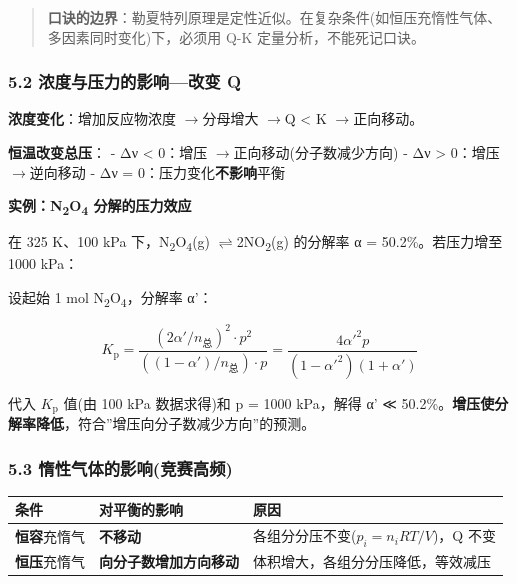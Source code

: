 \documentclass[a4paper,11pt]{ctexart}
\newcounter{none}
\newcommand{\箭}{\ensuremath{\rightarrow}}
\newcommand{\左箭}{\ensuremath{\leftarrow}}
\newcommand{\上箭}{\ensuremath{\uparrow}}
\newcommand{\下箭}{\ensuremath{\downarrow}}
\newcommand{\衡}{\ensuremath{\rightleftharpoons}}
\newcommand{\双箭}{\ensuremath{\leftrightarrow}}
\newcommand{\约等于}{\ensuremath{\approx}}
\newcommand{\小于等于}{\ensuremath{\leq}}
\newcommand{\大于等于}{\ensuremath{\geq}}
\newcommand{\不等于}{\ensuremath{\neq}}
\newcommand{\西格马}{\ensuremath{\sigma}}
\newcommand{\派}{\ensuremath{\pi}}
\begin{document}
\begin{quote}
\textbf{口诀的边界}：勒夏特列原理是定性近似。在复杂条件(如恒压充惰性气体、多因素同时变化)下，必须用 Q-K 定量分析，不能死记口诀。
\end{quote}

\subsubsection{5.2 浓度与压力的影响---改变 Q}\label{ux6d53ux5ea6ux4e0eux538bux529bux7684ux5f71ux54cdux6539ux53d8-q}

\textbf{浓度变化}：增加反应物浓度 \箭 分母增大 \箭 Q \textless{} K \箭 正向移动。

\textbf{恒温改变总压}：
- Δν \textless{} 0：增压 \箭 正向移动(分子数减少方向)
- Δν \textgreater{} 0：增压 \箭 逆向移动
- Δν = 0：压力变化\textbf{不影响}平衡

\textbf{实例：N\textsubscript{2}O\textsubscript{4} 分解的压力效应}

在 325 K、100 kPa 下，N\textsubscript{2}O\textsubscript{4}(g) \衡 2NO\textsubscript{2}(g) 的分解率 α = 50.2\%。若压力增至 1000 kPa：

设起始 1 mol N\textsubscript{2}O\textsubscript{4}，分解率 α'：

\[
K_{\mathrm p} = \frac{(2\alpha'/n_{总})^2 \cdot p^2}{((1-\alpha')/n_{总}) \cdot p} = \frac{4\alpha'^2 p}{(1-\alpha'^2)(1+\alpha')}
\]

代入 \(K_{\mathrm p}\) 值(由 100 kPa 数据求得)和 p = 1000 kPa，解得 α' ≪ 50.2\%。\textbf{增压使分解率降低}，符合''增压向分子数减少方向''的预测。

\subsubsection{5.3 惰性气体的影响(竞赛高频)}\label{ux60f0ux6027ux6c14ux4f53ux7684ux5f71ux54cdux7adeux8d5bux9ad8ux9891}

{\def\LTcaptype{none} %
\begin{longtable}[]{@{}
  >{\raggedright\arraybackslash}p{}
  >{\raggedright\arraybackslash}p{}
  >{\raggedright\arraybackslash}p{}@{}}
\toprule\noalign{}
\begin{minipage}[b]{\linewidth}\raggedright
条件
\end{minipage} & \begin{minipage}[b]{\linewidth}\raggedright
对平衡的影响
\end{minipage} & \begin{minipage}[b]{\linewidth}\raggedright
原因
\end{minipage} \\
\midrule\noalign{}
\endhead
\bottomrule\noalign{}
\endlastfoot
\textbf{恒容}充惰气 & \textbf{不移动} & 各组分分压不变(\(p_i = n_iRT/V\))，Q 不变 \\
\textbf{恒压}充惰气 & \textbf{向分子数增加方向移动} & 体积增大，各组分分压降低，等效减压 \\
\end{longtable}
}
\end{document}
